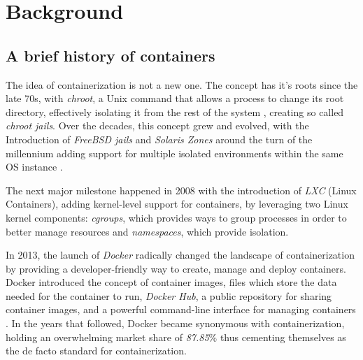 \chapter{Background}
\label{chapter:background}

\section{A brief history of containers}
\label{sec:history}
The idea of containerization is not a new one. The concept has it's roots
since the late 70s, with \textit{chroot}, a Unix command that allows a process to change its root directory,
effectively isolating it from the rest of the system \cite{history-of-containers}, creating
so called \textit{chroot jails}. Over the decades, this concept grew and evolved, with the Introduction
of \textit{FreeBSD jails} and \textit{Solaris Zones} around the turn of the millennium adding support for multiple 
isolated environments within the same OS instance \cite{history-of-containers}. 

The next major milestone happened in 2008 with the introduction of \textit{LXC} (Linux Containers),
adding kernel-level support for containers, by leveraging two Linux kernel components: \textit{cgroups}, which
provides ways to group processes in order to better manage resources and \textit{namespaces}, which provide isolation.\cite{history-of-containers}

In 2013, the launch of \textit{Docker} radically changed the landscape of containerization by providing a developer-friendly way to 
create, manage and deploy containers. Docker introduced the concept of container images, files which store the data needed for the container to run, 
\textit{Docker Hub}, a public repository for sharing container images, and a powerful command-line interface for managing containers \cite{history-of-containers}.
In the years that followed, Docker became synonymous with containerization, holding an overwhelming market share of \textit{87.85}\%\cite{docker-market-share} thus cementing
themselves as the de facto standard for containerization.


